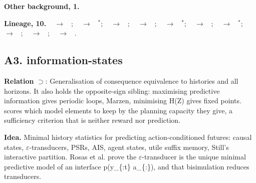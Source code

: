\documentclass[10pt]{article}
\newcommand{\memb}[1]{\par\smallskip\textbf{#1}\quad}
\begin{document}
\memb{Other background, 1.} {\footnotesize \citetext{\citealp{Feng-learning26}}}

\memb{Lineage, 10.} {\footnotesize \citeauthor{Larsen-bisimulation91}~\citeyear{Larsen-bisimulation91} $\to$ \citeauthor{Desharnais-bisimulation02}~\citeyear{Desharnais-bisimulation02}; \citeauthor{Desharnais-bisimulation02}~\citeyear{Desharnais-bisimulation02} $\to$ \citeauthor{Hermanns-probabilistic14}~\citeyear{Hermanns-probabilistic14}$^\ast$; \citeauthor{Ferns-metrics04}~\citeyear{Ferns-metrics04} $\to$ \citeauthor{Castro-equivalence09}~\citeyear{Castro-equivalence09}; \citeauthor{Castro-equivalence09}~\citeyear{Castro-equivalence09} $\to$ \citeauthor{Hermanns-probabilistic14}~\citeyear{Hermanns-probabilistic14}; \citeauthor{Castro-equivalence09}~\citeyear{Castro-equivalence09} $\to$ \citeauthor{Liu-returnbased21}~\citeyear{Liu-returnbased21}$^\ast$; \citeauthor{Castro-equivalence09}~\citeyear{Castro-equivalence09} $\to$ \citeauthor{Zhang-compositional26}~\citeyear{Zhang-compositional26}; \citeauthor{Hermanns-probabilistic14}~\citeyear{Hermanns-probabilistic14} $\to$ \citeauthor{Rosas-ai25}~\citeyear{Rosas-ai25}$^\ast$; \citeauthor{Lehnert-rewardpredictive20}~\citeyear{Lehnert-rewardpredictive20} $\to$ \citeauthor{Lehnert-rewardpredictive22}~\citeyear{Lehnert-rewardpredictive22}; \citeauthor{Huang-action22}~\citeyear{Huang-action22} $\to$ \citeauthor{Feng-factored22}~\citeyear{Feng-factored22}; \citeauthor{Liu-returnbased21}~\citeyear{Liu-returnbased21} $\to$ \citeauthor{Yang-learning22}~\citeyear{Yang-learning22}.}

\subsection{A3. information-states}\label{node:S6-S6-A-information-states}
\textbf{Relation} $\supset$: Generalisation of consequence equivalence to histories and all horizons. It also holds the opposite-sign sibling: maximising predictive information gives periodic loops, Marzen, minimising H(Z) gives fixed points. \citet{Dai-worth26} scores which model elements to keep by the planning capacity they give, a sufficiency criterion that is neither reward nor prediction.

\textbf{Idea.} Minimal history statistics for predicting action-conditioned futures: causal states, \ensuremath{\varepsilon}-transducers, PSRs, AIS, agent states, utile suffix memory, Still's interactive partition. Rosas et al. prove the \ensuremath{\varepsilon}-transducer is the unique minimal predictive model of an interface p(y\_\{:t\} \textbar{} a\_\{:\}), and that bisimulation reduces transducers.
\end{document}
